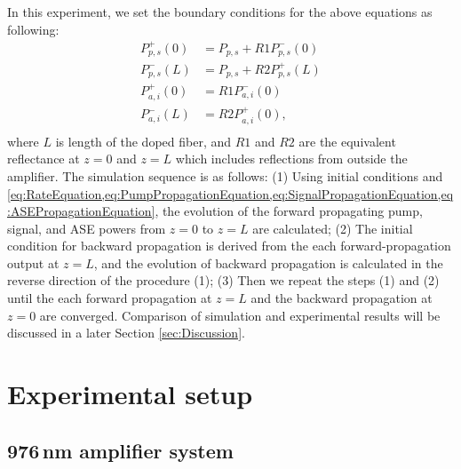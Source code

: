 \documentclass{osa-article}
\begin{document}
In this experiment, we set the boundary conditions for the above equations as following:
\begin{equation}
  \begin{split}
    P_{p, s}^{+}(0) &= P_{p, s} + R1P_{p, s}^{-}(0) \\
    P_{p, s}^{-}(L) &= P_{p, s} + R2P_{p, s}^{+}(L) \\
    P_{a, i}^{+}(0) &= R1P_{a, i}^{-}(0) \\
    P_{a, i}^{-}(L) &= R2P_{a, i}^{+}(0), \\
  \end{split}
\end{equation}
where $L$ is length of the doped fiber, and $R1$ and $R2$ are the equivalent reflectance at $z = 0$ and $z = L$ which includes reflections from outside the amplifier.
The simulation sequence is as follows:
(1) Using initial conditions and \cref{eq:RateEquation,eq:PumpPropagationEquation,eq:SignalPropagationEquation,eq:ASEPropagationEquation}, the evolution of the forward propagating pump, signal, and ASE powers from $z = 0$ to $z = L$ are calculated;
(2) The initial condition for backward propagation is derived from the each forward-propagation output at $z = L$, and the evolution of backward propagation is calculated in the reverse direction of the procedure (1);
(3) Then we repeat the steps (1) and (2) until the each forward propagation at $z = L$ and the backward propagation at $z = 0$ are converged.
Comparison of simulation and experimental results will be discussed in a later Section \ref{sec:Discussion}.


\section{Experimental setup}
\subsection{976\,nm amplifier system}
\end{document}
